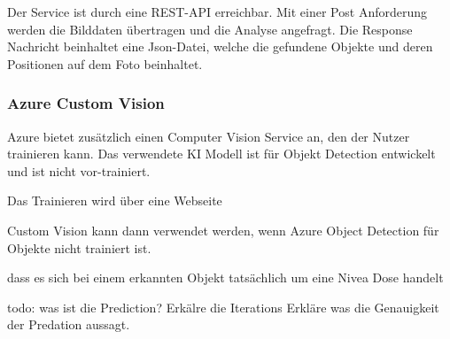 Der Service ist durch eine REST-API erreichbar. Mit einer Post Anforderung werden die Bilddaten übertragen und die Analyse angefragt. Die Response Nachricht beinhaltet eine Json-Datei, welche die gefundene Objekte und deren Positionen auf dem Foto beinhaltet. 


\subsubsection{Azure Custom Vision}
Azure bietet zusätzlich einen Computer Vision Service an, den der Nutzer trainieren kann. 
Das verwendete KI Modell ist für Objekt Detection entwickelt und ist nicht vor-trainiert.

Das Trainieren wird über eine Webseite 

Custom Vision kann dann verwendet werden, wenn Azure Object Detection für Objekte nicht trainiert ist.\citep{Azure302bDoc}


dass es sich bei einem erkannten Objekt tatsächlich um eine Nivea Dose handelt


todo: was ist die Prediction? 
Erkälre die Iterations
Erkläre was die Genauigkeit der Predation aussagt.


